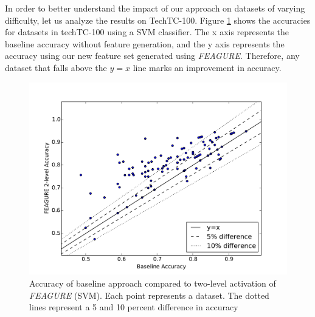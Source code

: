 \documentclass{article}
\theoremstyle{definition}
\begin{document}

In order to better understand the impact of our approach on datasets of varying difficulty, let us analyze the results on TechTC-100. Figure \ref{fig:svm_base_lvl2} shows the accuracies for datasets in techTC-100 using a SVM classifier. The x axis represents the baseline accuracy without feature generation, and the y axis represents the accuracy using our new feature set generated using \emph{FEAGURE}. Therefore, any dataset that falls above the $y=x$ line marks an improvement in accuracy. %


\begin{figure}
	\centering
	\includegraphics[width=0.7\linewidth]{svm_full_lvl2}
	\caption{Accuracy of
		baseline approach compared to two-level activation of \emph{FEAGURE} (SVM). Each point represents a dataset. The dotted lines represent a 5 and 10 percent difference in accuracy}
	\label{fig:svm_base_lvl2}
\end{figure}
\end{document}
